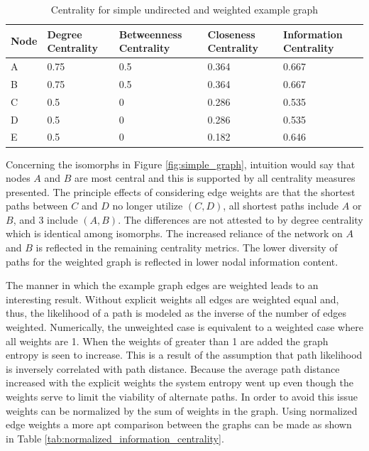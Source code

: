 \begin{table}[H]
	\centering
	\caption{Centrality for simple undirected and weighted example graph}
	\label{tab:weighted_centrality}
	\begin{tabular}{|C{.2\linewidth}|C{.2\linewidth}|C{.2\linewidth}|C{.2\linewidth}|C{.2\linewidth}|}
		\hline Node & Degree Centrality & Betweenness Centrality & Closeness Centrality & Information Centrality \\
		\hline A & 0.75 & 0.5 & 0.364 & 0.667 \\
		\hline B & 0.75 & 0.5 & 0.364 & 0.667 \\
		\hline C & 0.5 & 0 & 0.286 & 0.535 \\
		\hline D & 0.5 & 0 & 0.286 & 0.535 \\
		\hline E & 0.5 & 0 & 0.182 & 0.646 \\
		\hline
	\end{tabular}
\end{table}

Concerning the isomorphs in Figure \ref{fig:simple_graph}, intuition would say that nodes $A$ and $B$ are most central and this is supported by all centrality measures presented. The principle effects of considering edge weights are that the shortest paths between $C$ and $D$ no longer utilize $(C, D)$, all shortest paths include $A$ or $B$, and 3 include $(A, B)$. The differences are not attested to by degree centrality which is identical among isomorphs. The increased reliance of the network on $A$ and $B$ is reflected in the remaining centrality metrics. The lower diversity of paths for the weighted graph is reflected in lower nodal information content.

The manner in which the example graph edges are weighted leads to an interesting result. Without explicit weights all edges are weighted equal and, thus, the likelihood of a path is modeled as the inverse of the number of edges weighted. Numerically, the unweighted case is equivalent to a weighted case where all weights are 1. When the weights of greater than 1 are added the graph entropy is seen to increase. This is a result of the assumption that path likelihood is inversely correlated with path distance. Because the average path distance increased with the explicit weights the system entropy went up even though the weights serve to limit the viability of alternate paths. In order to avoid this issue weights can be normalized by the sum of weights in the graph. Using normalized edge weights a more apt comparison between the graphs can be made as shown in Table \ref{tab:normalized_information_centrality}.

